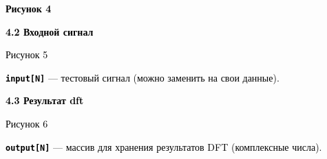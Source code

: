 \documentclass[a4paper]{article}
\newcommand\textstyleStrongEmphasis[1]{\textbf{#1}}
\newcommand\textstyleSourceText[1]{\texttt{#1}}
\begin{document}
\bigskip

{\centering\bfseries
\foreignlanguage{russian}{\textmd{\textcolor{black}{Рисунок 4}}}
\par}


\bigskip


\bigskip

{\bfseries
\foreignlanguage{russian}{\textcolor{black}{4.2 Входной сигнал}}}


\bigskip



\begin{center}
\end{center}

\bigskip


\bigskip

{\centering
\foreignlanguage{russian}{\textcolor{black}{Рисунок 5}}
\par}


\bigskip

\textstyleStrongEmphasis{\textstyleSourceText{\foreignlanguage{russian}{\textrm{\textcolor{black}{input[N]}}}}}\foreignlanguage{russian}{\textcolor{black}{
— тестовый сигнал (можно заменить на свои данные).}}


\bigskip

{\bfseries
\foreignlanguage{russian}{\textcolor{black}{4.3 Результат }}\foreignlanguage{english}{\textcolor{black}{dft}}}


\bigskip



\begin{center}
\end{center}

\bigskip


\bigskip

{\centering{}
\textcolor{black}{Рисунок 6}
\par}


\bigskip


\bigskip

{
\textstyleStrongEmphasis{\textstyleSourceText{\textrm{\textcolor{black}{output[N]}}}}\textcolor{black}{ — массив для
хранения результатов DFT (комплексные числа).}}


\bigskip
\end{document}
